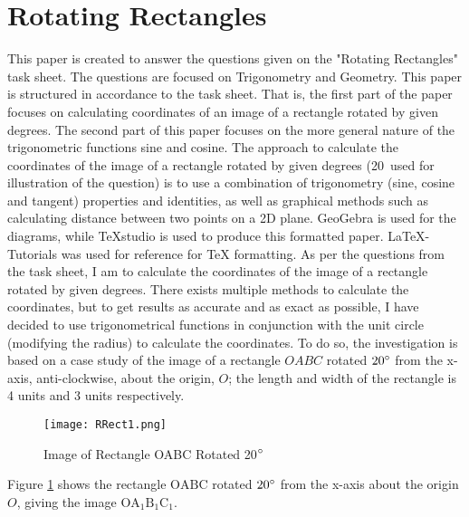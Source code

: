 \documentclass{article}
\begin{document}
    \newpage
    \section{Rotating Rectangles}
    This paper is created to answer the questions given on the "Rotating Rectangles" task sheet. The questions are focused on  Trigonometry and Geometry.
    \newline\newline
    This paper is structured in accordance to the task sheet. That is, the first part of the paper focuses on calculating coordinates of an image of a rectangle rotated by given degrees. The second part of this paper focuses on the more general nature of the trigonometric functions sine and cosine.
    \newline\newline
    The approach to calculate the coordinates of the image of a rectangle rotated by given degrees (20\degree \ used for illustration of the question) is to use a combination of trigonometry (sine, cosine and tangent) properties and identities, as well as graphical methods such as calculating distance between two points on a 2D plane.
    \newline\newline
    GeoGebra\autocite{GEOGEBRA:1} is used for the diagrams, while TeXstudio\autocite{TEXSTUDIO:1} is used to produce this formatted paper. LaTeX-Tutorials\autocite{LATEX:1} was used for reference for TeX formatting.
    \newline\newline
    As per the questions from the task sheet, I am to calculate the coordinates of the image of a rectangle rotated by given degrees. There exists multiple methods to calculate the coordinates, but to get results as accurate and as exact as possible, I have decided to use trigonometrical functions in conjunction with the unit circle (modifying the radius) to calculate the coordinates. To do so, the investigation is based on a case study of the image of a rectangle $OABC$ rotated $20\degree$ from the x-axis, anti-clockwise, about the origin, $O$; the length and width of the rectangle is 4 units and 3 units respectively.
    \begin{figure}[h!]
        \texttt{[image: RRect1.png]}
        \caption{Image of Rectangle OABC Rotated 20$\degree$}
        \label{fig:rrect1}
    \end{figure} \newline
    Figure \ref{fig:rrect1} shows the rectangle $\mathrm{OABC}$ rotated $20\degree$ from the x-axis about the origin $O$, giving the image $\mathrm{OA_1B_1C_1}$.
\end{document}
